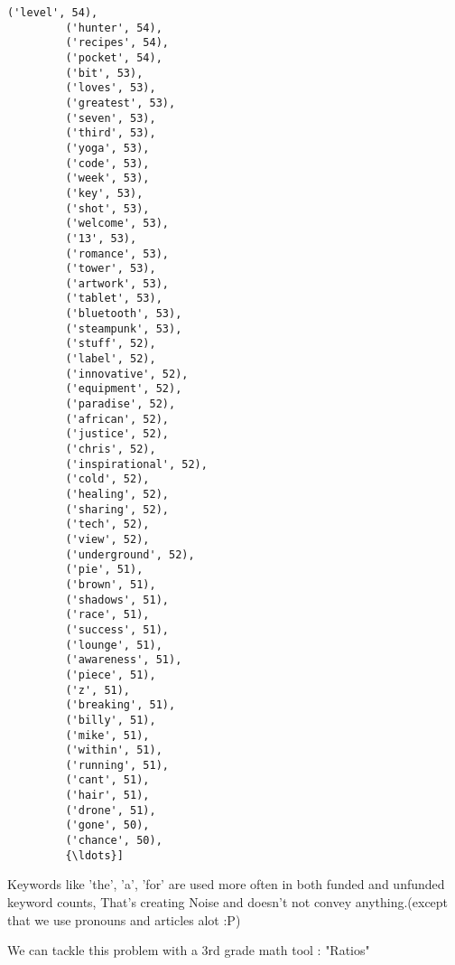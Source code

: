 \documentclass[11pt]{article}
\begin{document}
\begin{Verbatim}[commandchars=\\\{\}]
         ('level', 54),
         ('hunter', 54),
         ('recipes', 54),
         ('pocket', 54),
         ('bit', 53),
         ('loves', 53),
         ('greatest', 53),
         ('seven', 53),
         ('third', 53),
         ('yoga', 53),
         ('code', 53),
         ('week', 53),
         ('key', 53),
         ('shot', 53),
         ('welcome', 53),
         ('13', 53),
         ('romance', 53),
         ('tower', 53),
         ('artwork', 53),
         ('tablet', 53),
         ('bluetooth', 53),
         ('steampunk', 53),
         ('stuff', 52),
         ('label', 52),
         ('innovative', 52),
         ('equipment', 52),
         ('paradise', 52),
         ('african', 52),
         ('justice', 52),
         ('chris', 52),
         ('inspirational', 52),
         ('cold', 52),
         ('healing', 52),
         ('sharing', 52),
         ('tech', 52),
         ('view', 52),
         ('underground', 52),
         ('pie', 51),
         ('brown', 51),
         ('shadows', 51),
         ('race', 51),
         ('success', 51),
         ('lounge', 51),
         ('awareness', 51),
         ('piece', 51),
         ('z', 51),
         ('breaking', 51),
         ('billy', 51),
         ('mike', 51),
         ('within', 51),
         ('running', 51),
         ('cant', 51),
         ('hair', 51),
         ('drone', 51),
         ('gone', 50),
         ('chance', 50),
         {\ldots}]
\end{Verbatim}
            
    Keywords like 'the', 'a', 'for' are used more often in both funded and
unfunded keyword counts, That's creating Noise and doesn't not convey
anything.(except that we use pronouns and articles alot :P)

    We can tackle this problem with a 3rd grade math tool : "Ratios"
\end{document}
